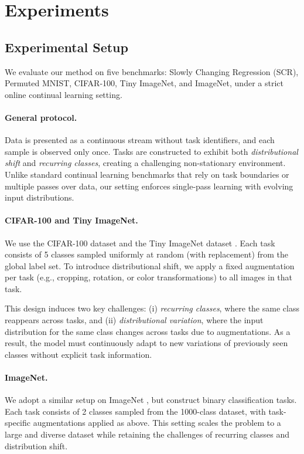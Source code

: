 \documentclass{article}
\begin{document}

\section{Experiments}
\label{sec:experiment}
\normalfont
\raggedright
\subsection{Experimental Setup}

We evaluate our method on five benchmarks: Slowly Changing Regression (SCR), Permuted MNIST, CIFAR-100, Tiny ImageNet, and ImageNet, under a strict online continual learning setting.


\paragraph{General protocol.}
Data is presented as a continuous stream without task identifiers, and each sample is observed only once. Tasks are constructed to exhibit both \emph{distributional shift} and \emph{recurring classes}, creating a challenging non-stationary environment. Unlike standard continual learning benchmarks that rely on task boundaries or multiple passes over data, our setting enforces single-pass learning with evolving input distributions.

\paragraph{CIFAR-100 and Tiny ImageNet.}
We use the CIFAR-100 dataset \citep{krizhevsky2009learning} and the Tiny ImageNet dataset \citep{tinyimagenet}. Each task consists of 5 classes sampled uniformly at random (with replacement) from the global label set. To introduce distributional shift, we apply a fixed augmentation per task (e.g., cropping, rotation, or color transformations) to all images in that task.

This design induces two key challenges: (i) \emph{recurring classes}, where the same class reappears across tasks, and (ii) \emph{distributional variation}, where the input distribution for the same class changes across tasks due to augmentations. As a result, the model must continuously adapt to new variations of previously seen classes without explicit task information.


\paragraph{ImageNet.}
We adopt a similar setup on ImageNet \citep{deng2009imagenet}, but construct binary classification tasks. Each task consists of 2 classes sampled from the 1000-class dataset, with task-specific augmentations applied as above. This setting scales the problem to a large and diverse dataset while retaining the challenges of recurring classes and distribution shift.
\end{document}
